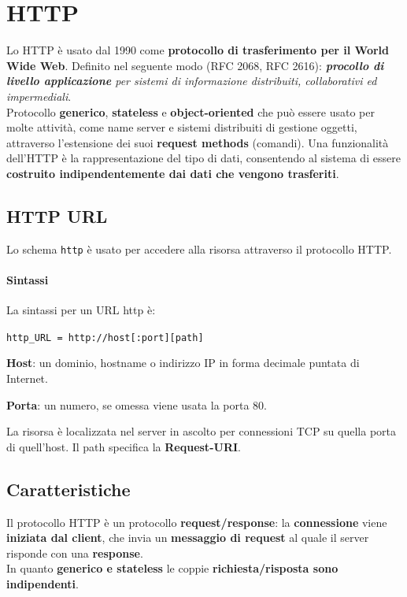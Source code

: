 \documentclass[10pt]{article}
\begin{document}
\section{HTTP}
Lo HTTP è usato dal 1990 come \textbf{protocollo di trasferimento per il World Wide Web}. Definito nel seguente modo (RFC 2068, RFC 2616): \textit{\textbf{procollo di livello applicazione} per sistemi di informazione distribuiti, collaborativi ed impermediali}.\\
Protocollo \textbf{generico}, \textbf{stateless} e \textbf{object-oriented} che può essere usato per molte attività, come name server e sistemi distribuiti di gestione oggetti, attraverso l'estensione dei suoi \textbf{request methods} (comandi). Una funzionalità dell'HTTP è la rappresentazione del tipo di dati, consentendo al sistema di essere \textbf{costruito indipendentemente dai dati che vengono trasferiti}.
\subsection{HTTP URL}
Lo schema \texttt{http} è usato per accedere alla risorsa attraverso il protocollo HTTP.
\paragraph{Sintassi} La sintassi per un URL http è:\\
\begin{center}
\texttt{http\_URL = http://host[:port][path]}
\end{center}
\begin{list}{}{}
\item \textbf{Host}: un dominio, hostname o indirizzo IP in forma decimale puntata di Internet.
\item \textbf{Porta}: un numero, se omessa viene usata la porta 80.
\end{list}
La risorsa è localizzata nel server in ascolto per connessioni TCP su quella porta di quell'host. Il path specifica la \textbf{Request-URI}.
\subsection{Caratteristiche}
Il protocollo HTTP è un protocollo \textbf{request/response}: la \textbf{connessione} viene \textbf{iniziata dal client}, che invia un \textbf{messaggio di request} al quale il server risponde con una \textbf{response}.\\
In quanto \textbf{generico e stateless} le coppie \textbf{richiesta/risposta sono indipendenti}.
\end{document}
